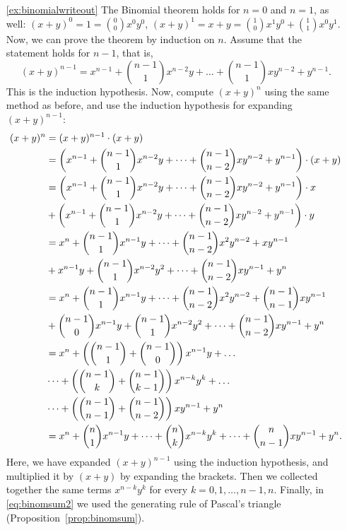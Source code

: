 \begin{enumerate}
\item[\ref{ex:binomialwriteout}]
The Binomial theorem holds for $n=0$ and $n=1$, as well: 
$(x+y)^0 = 1 = \binom{0}{0} x^0 y^0$, 
$(x+y)^1 = x + y = \binom{1}{0} x^1 y^0 + \binom{1}{1} x^0 y^1$. 
Now, we can prove the theorem by induction on $n$. 
Assume that the statement holds for $n-1$, 
that is, 
\[
(x+y)^{n-1} = x^{n-1} + \binom{n-1}{1} x^{n-2}y + \dots + \binom{n-1}{1} xy^{n-2} + y^{n-1}. 
\]
This is the induction hypothesis. 
Now, compute $(x+y)^n$ using the same method as before, 
and use the induction hypothesis for expanding $(x+y)^{n-1}$: 
\begin{align}
\notag (x+y)^n &= (x+y)^{n-1} \cdot (x+y) \\ 
\notag &= \left( x^{n-1} + \binom{n-1}{1} x^{n-2}y + \dots + \binom{n-1}{n-2} xy^{n-2} + y^{n-1} \right) \cdot \left( x + y \right) \\
\notag &= \left( x^{n-1} + \binom{n-1}{1} x^{n-2}y + \dots + \binom{n-1}{n-2} xy^{n-2} + y^{n-1} \right) \cdot x \\
\notag &+ \left( x^{n-1} + \binom{n-1}{1} x^{n-2}y + \dots + \binom{n-1}{n-2} xy^{n-2} + y^{n-1} \right) \cdot y \\
\notag &= x^{n} + \binom{n-1}{1} x^{n-1}y + \dots + \binom{n-1}{n-2} x^2y^{n-2} + xy^{n-1} \\
\notag &+ x^{n-1}y + \binom{n-1}{1} x^{n-2}y^2 + \dots + \binom{n-1}{n-2} xy^{n-1} + y^{n} \\
\notag &= x^{n} + \binom{n-1}{1} x^{n-1}y + \dots + \binom{n-1}{n-2} x^2y^{n-2} + \binom{n-1}{n-1} xy^{n-1} \\
\notag &+ \binom{n-1}{0} x^{n-1}y + \binom{n-1}{1} x^{n-2}y^2 + \dots + \binom{n-1}{n-2} xy^{n-1} + y^{n} \\
\notag &= x^n + \left( \binom{n-1}{1} + \binom{n-1}{0} \right) x^{n-1}y + \dots \\
\notag &\dots + \left( \binom{n-1}{k} + \binom{n-1}{k-1} \right) x^{n-k}y^k + \dots \\
\notag &\dots + \left( \binom{n-1}{n-1} + \binom{n-1}{n-2} \right) xy^{n-1} + y^n \\
\label{eq:binomsum2} &= x^n + \binom{n}{1} x^{n-1}y + \dots %
+ \binom{n}{k} x^{n-k}y^k + \dots %
+ \binom{n}{n-1}xy^{n-1} + y^n.
\end{align}
Here, we have expanded $(x+y)^{n-1}$ using the induction hypothesis, 
and multiplied it by $(x+y)$ by expanding the brackets. 
Then we collected together the same terms $x^{n-k}y^k$ for every $k=0, 1, \dots , n-1, n$. 
Finally, in \eqref{eq:binomsum2} we used the generating rule of Pascal's triangle (Proposition~\ref{prop:binomsum}). 


\end{enumerate}
